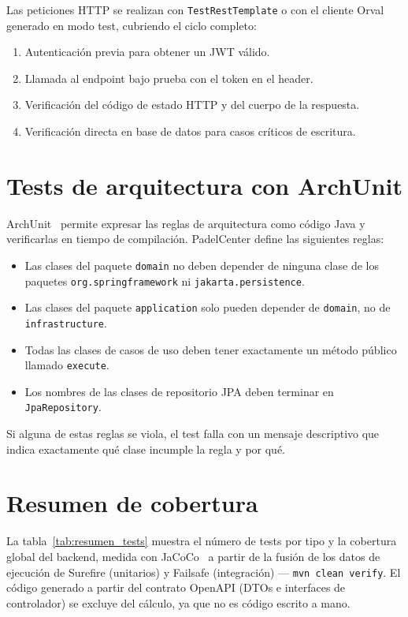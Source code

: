 Las peticiones HTTP se realizan con \texttt{TestRestTemplate} o con el cliente
Orval generado en modo test, cubriendo el ciclo completo:

\begin{enumerate}
  \item Autenticación previa para obtener un JWT válido.
  \item Llamada al endpoint bajo prueba con el token en el header.
  \item Verificación del código de estado HTTP y del cuerpo de la respuesta.
  \item Verificación directa en base de datos para casos críticos de escritura.
\end{enumerate}

\section{Tests de arquitectura con ArchUnit}
\label{sec:tests_arquitectura}

ArchUnit~\cite{archunit} permite expresar las reglas de arquitectura como código Java y
verificarlas en tiempo de compilación. PadelCenter define las siguientes reglas:

\begin{itemize}
  \item Las clases del paquete \texttt{domain} no deben depender de ninguna
    clase de los paquetes \texttt{org.springframework} ni
    \texttt{jakarta.persistence}.
  \item Las clases del paquete \texttt{application} solo pueden depender de
    \texttt{domain}, no de \texttt{infrastructure}.
  \item Todas las clases de casos de uso deben tener exactamente un método
    público llamado \texttt{execute}.
  \item Los nombres de las clases de repositorio JPA deben terminar en
    \texttt{JpaRepository}.
\end{itemize}

Si alguna de estas reglas se viola, el test falla con un mensaje descriptivo que
indica exactamente qué clase incumple la regla y por qué.

\section{Resumen de cobertura}
\label{sec:resumen_cobertura}

La tabla~\ref{tab:resumen_tests} muestra el número de tests por tipo y la
cobertura global del backend, medida con JaCoCo~\cite{jacoco} a partir de la
fusión de los datos de ejecución de Surefire (unitarios) y Failsafe
(integración) — \texttt{mvn clean verify}. El código generado a partir del
contrato OpenAPI (DTOs e interfaces de controlador) se excluye del cálculo,
ya que no es código escrito a mano.

